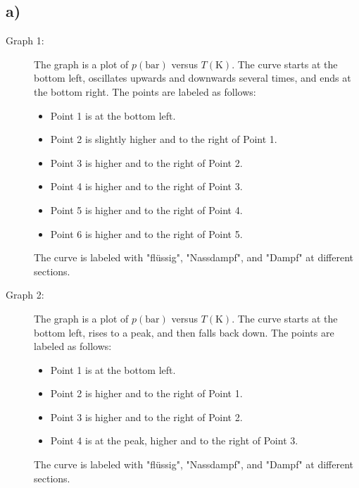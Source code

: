 

\subsection*{a)}

\begin{description}
    \item[Graph 1:] The graph is a plot of \( p(\text{bar}) \) versus \( T(\text{K}) \). The curve starts at the bottom left, oscillates upwards and downwards several times, and ends at the bottom right. The points are labeled as follows:
    \begin{itemize}
        \item Point 1 is at the bottom left.
        \item Point 2 is slightly higher and to the right of Point 1.
        \item Point 3 is higher and to the right of Point 2.
        \item Point 4 is higher and to the right of Point 3.
        \item Point 5 is higher and to the right of Point 4.
        \item Point 6 is higher and to the right of Point 5.
    \end{itemize}
    The curve is labeled with "flüssig", "Nassdampf", and "Dampf" at different sections.
\end{description}

\begin{description}
    \item[Graph 2:] The graph is a plot of \( p(\text{bar}) \) versus \( T(\text{K}) \). The curve starts at the bottom left, rises to a peak, and then falls back down. The points are labeled as follows:
    \begin{itemize}
        \item Point 1 is at the bottom left.
        \item Point 2 is higher and to the right of Point 1.
        \item Point 3 is higher and to the right of Point 2.
        \item Point 4 is at the peak, higher and to the right of Point 3.
    \end{itemize}
    The curve is labeled with "flüssig", "Nassdampf", and "Dampf" at different sections.
\end{description}